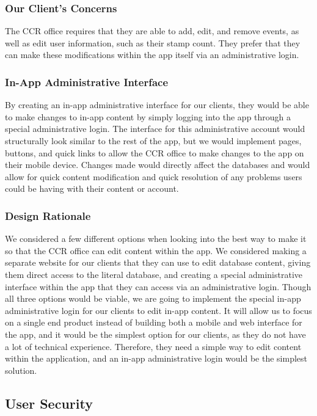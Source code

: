 \documentclass[draftclsnofoot, onecolumn, 10pt, compsoc]{IEEEtran}
\begin{document}
			\subsubsection{Our Client's Concerns}
				The CCR office requires that they are able to add, edit, and remove events, as well as edit user information, such as their stamp count. They prefer that they can make these modifications within the app itself via an administrative login.
			\subsubsection{In-App Administrative Interface}
				By creating an in-app administrative interface for our clients, they would be able to make changes to in-app content by simply logging into the app through a special administrative login. The interface for this administrative account would structurally look similar to the rest of the app, but we would implement pages, buttons, and quick links to allow the CCR office to make changes to the app on their mobile device. Changes made would directly affect the databases and would allow for quick content modification and quick resolution of any problems users could be having with their content or account.
			\subsubsection{Design Rationale}
				We considered a few different options when looking into the best way to make it so that the CCR office can edit content within the app. We considered making a separate website for our clients that they can use to edit database content, giving them direct access to the literal database, and creating a special administrative interface within the app that they can access via an administrative login. Though all three options would be viable, we are going to implement the special in-app administrative login for our clients to edit in-app content. It will allow us to focus on a single end product instead of building both a mobile and web interface for the app, and it would be the simplest option for our clients, as they do not have a lot of technical experience. Therefore, they need a simple way to edit content within the application, and an in-app administrative login would be the simplest solution.

		\subsection{User Security}
\end{document}
